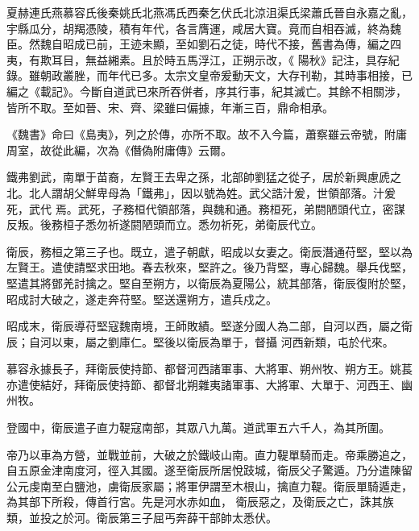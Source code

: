 
\begin{pinyinscope}

 夏赫連氏燕慕容氏後秦姚氏北燕馮氏西秦乞伏氏北涼沮渠氏梁蕭氏晉自永嘉之亂，宇縣瓜分，胡羯憑陵，積有年代，各言膺運，咸居大寶。竟而自相吞滅，終為魏臣。然魏自昭成已前，王迹未顯，至如劉石之徒，時代不接，舊書為傳，編之四夷，有欺耳目，無益緗素。且於時五馬浮江，正朔示改，《
 陽秋》記注，具存紀錄。雖朝政叢脞，而年代已多。太宗文皇帝爰動天文，大存刊勒，其時事相接，已編之《載記》。今斷自道武已來所吞併者，序其行事，紀其滅亡。其餘不相關涉，皆所不取。至如晉、宋、齊、梁雖曰偏據，年漸三百，鼎命相承。



 《魏書》命曰《島夷》，列之於傳，亦所不取。故不入今篇，蕭察雖云帝號，附庸周室，故從此編，次為《僭偽附庸傳》云爾。



 鐵弗劉武，南單于苗裔，左賢王去卑之孫，北部帥劉猛之從子，居於新興慮虒之北。北人謂胡父鮮卑母為「鐵弗」，因以號為姓。武父誥汁爰，世領部落。汁爰死，武代
 焉。武死，子務桓代領部落，與魏和通。務桓死，弟閼陋頭代立，密謀反叛。後務桓子悉勿祈遂閼陋頭而立。悉勿祈死，弟衛辰代立。



 衛辰，務桓之第三子也。既立，遣子朝獻，昭成以女妻之。衛辰潛通苻堅，堅以為左賢王。遣使請堅求田地。春去秋來，堅許之。後乃背堅，專心歸魏。舉兵伐堅，堅遣其將鄧羌討擒之。堅自至朔方，以衛辰為夏陽公，統其部落，衛辰復附於堅，昭成討大破之，遂走奔苻堅。堅送還朔方，遣兵戍之。



 昭成末，衛辰導苻堅寇魏南境，王師敗績。堅遂分國人為二部，自河以西，屬之衛辰；自河以東，屬之劉庫仁。堅後以衛辰為單于，督攝
 河西新類，屯於代來。



 慕容永據長子，拜衛辰使持節、都督河西諸軍事、大將軍、朔州牧、朔方王。姚萇亦遣使結好，拜衛辰使持節、都督北朔雜夷諸軍事、大將軍、大單于、河西王、幽州牧。



 登國中，衛辰遣子直力鞮寇南部，其眾八九萬。道武軍五六千人，為其所圍。



 帝乃以車為方營，並戰並前，大破之於鐵岐山南。直力鞮單騎而走。帝乘勝追之，自五原金津南度河，徑入其國。遂至衛辰所居悅跂城，衛辰父子驚遁。乃分遣陳留公元虔南至白鹽池，虜衛辰家屬；將軍伊謂至木根山，擒直力鞮。衛辰單騎遁走，為其部下所殺，傳首行宮。先是河水赤如血，
 衛辰惡之，及衛辰之亡，誅其族類，並投之於河。衛辰第三子屈丐奔薛干部帥太悉伏。




\end{pinyinscope}
